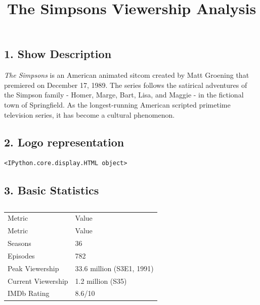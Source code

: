 \documentclass[
  a4paper,
]{article}
\title{The Simpsons Viewership Analysis}
\author{}
\date{}
\renewcommand*\contentsname{Table of contents}
\newcommand\contentsname{Table of contents}
\begin{document}
\maketitle

\renewcommand*\contentsname{Table of contents}
{
\hypersetup{linkcolor=}
\setcounter{tocdepth}{3}
\tableofcontents
}

\subsection{1. Show Description}\label{show-description}

\emph{The Simpsons} is an American animated sitcom created by Matt
Groening that premiered on December 17, 1989. The series follows the
satirical adventures of the Simpson family - Homer, Marge, Bart, Lisa,
and Maggie - in the fictional town of Springfield. As the
longest-running American scripted primetime television series, it has
become a cultural phenomenon.

\subsection{2. Logo representation}\label{logo-representation}

\begin{verbatim}
<IPython.core.display.HTML object>
\end{verbatim}

\subsection{3. Basic Statistics}\label{basic-statistics}

\begin{longtable}[]{@{}ll@{}}

\caption{\label{tbl-stats}Basic Statistics}

\tabularnewline

\caption{}\label{T_27ee7}\tabularnewline
\toprule\noalign{}
Metric & Value \\
\midrule\noalign{}
\endfirsthead
\toprule\noalign{}
Metric & Value \\
\midrule\noalign{}
\endhead
\bottomrule\noalign{}
\endlastfoot
Seasons & 36 \\
Episodes & 782 \\
Peak Viewership & 33.6 million (S3E1, 1991) \\
Current Viewership & 1.2 million (S35) \\
IMDb Rating & 8.6/10 \\

\end{longtable}
\end{document}
